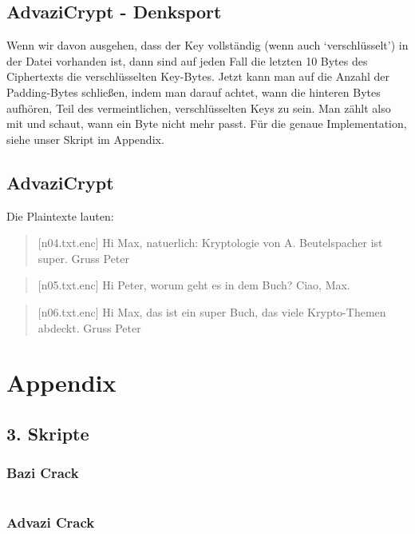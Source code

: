 \documentclass[10pt,a4paper]{article}
\begin{document}
\subsection{AdvaziCrypt - Denksport}
Wenn wir davon ausgehen, dass der Key vollständig (wenn auch `verschlüsselt') in der Datei vorhanden ist,
dann sind auf jeden Fall die letzten 10 Bytes des Ciphertexts die verschlüsselten Key-Bytes. Jetzt kann man
auf die Anzahl der Padding-Bytes schließen, indem man darauf achtet, wann die hinteren Bytes aufhören, Teil
des vermeintlichen, verschlüsselten Keys zu sein. Man zählt also mit und schaut, wann ein Byte nicht mehr passt.
Für die genaue Implementation, siehe unser Skript im Appendix.

\subsection{AdvaziCrypt}
Die Plaintexte lauten:
\begin{quote}[n04.txt.enc]
Hi Max, natuerlich: Kryptologie von A. Beutelspacher ist super. Gruss Peter
\end{quote}
\begin{quote}[n05.txt.enc]
Hi Peter, worum geht es in dem Buch? Ciao, Max.
\end{quote}
\begin{quote}[n06.txt.enc]
Hi Max, das ist ein super Buch, das viele Krypto-Themen abdeckt. Gruss Peter
\end{quote}

\newpage
\section*{Appendix}
\subsection{3. Skripte}
\subsubsection*{Bazi Crack}
\inputminted{python}{crack_bazi.py}

\newpage

\subsubsection*{Advazi Crack}
\inputminted{python}{crack_advazi.py}
\end{document}
